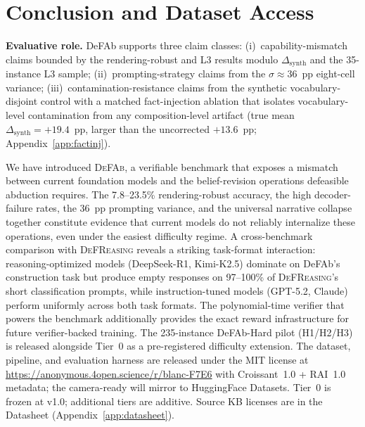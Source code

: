 \documentclass{article}
\theoremstyle{definition}
\begin{document}
\section{Conclusion and Dataset Access}\label{sec:conclusion}

\textbf{Evaluative role.} DeFAb supports three claim classes: (i)~capability-mismatch claims bounded by the rendering-robust and L3 results modulo $\Delta_{\mathrm{synth}}$ and the 35-instance L3 sample; (ii)~prompting-strategy claims from the $\sigma \approx 36$~pp eight-cell variance; (iii)~contamination-resistance claims from the synthetic vocabulary-disjoint control with a matched fact-injection ablation that isolates vocabulary-level contamination from any composition-level artifact (true mean $\Delta_{\mathrm{synth}} = +19.4$~pp, larger than the uncorrected $+13.6$~pp; Appendix~\ref{app:factinj}).

We have introduced \textsc{DeFAb}, a verifiable benchmark that exposes a mismatch between current foundation models and the belief-revision operations defeasible abduction requires. The 7.8--23.5\% rendering-robust accuracy, the high decoder-failure rates, the 36~pp prompting variance, and the universal narrative collapse together constitute evidence that current models do not reliably internalize these operations, even under the easiest difficulty regime. A cross-benchmark comparison with \textsc{DeFReasing} reveals a striking task-format interaction: reasoning-optimized models (DeepSeek-R1, Kimi-K2.5) dominate on DeFAb's construction task but produce empty responses on 97--100\% of \textsc{DeFReasing}'s short classification prompts, while instruction-tuned models (GPT-5.2, Claude) perform uniformly across both task formats. The polynomial-time verifier that powers the benchmark additionally provides the exact reward infrastructure for future verifier-backed training. The 235-instance DeFAb-Hard pilot (H1/H2/H3) is released alongside Tier~0 as a pre-registered difficulty extension. The dataset, pipeline, and evaluation harness are released under the MIT license at \url{https://anonymous.4open.science/r/blanc-F7E6} with Croissant~1.0 + RAI~1.0 metadata; the camera-ready will mirror to HuggingFace Datasets. Tier~0 is frozen at v1.0; additional tiers are additive. Source KB licenses are in the Datasheet (Appendix~\ref{app:datasheet}).




\end{document}
